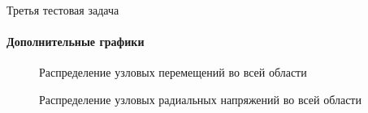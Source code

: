 \documentclass{beamer}
\begin{document}
\begin{frame}{Третья тестовая задача}
\framesubtitle{Дополнительные графики}
\footnotesize
\begin{multicols}{2}
\begin{figure}[h]
\caption{Распределение узловых перемещений во всей области}
\end{figure}
\columnbreak
\begin{figure}[h]
\caption{Распределение узловых радиальных напряжений во всей области}
\end{figure}
\end{multicols}
\end{frame}
\end{document}
